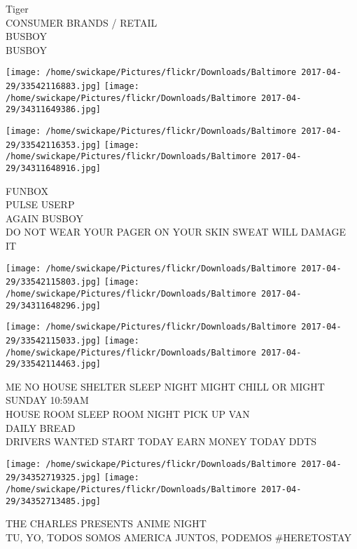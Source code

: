 \documentclass[10pt,letterpaper]{article}
\begin{document}
Tiger\\
CONSUMER BRANDS / RETAIL\\
BUSBOY\\
BUSBOY\\
\pagebreak

\texttt{[image: /home/swickape/Pictures/flickr/Downloads/Baltimore 2017-04-29/33542116883.jpg]}
\texttt{[image: /home/swickape/Pictures/flickr/Downloads/Baltimore 2017-04-29/34311649386.jpg]}

\texttt{[image: /home/swickape/Pictures/flickr/Downloads/Baltimore 2017-04-29/33542116353.jpg]}
\texttt{[image: /home/swickape/Pictures/flickr/Downloads/Baltimore 2017-04-29/34311648916.jpg]}

FUNBOX\\
PULSE USERP\\
AGAIN BUSBOY\\
DO NOT WEAR YOUR PAGER ON YOUR SKIN SWEAT WILL DAMAGE IT\\
\pagebreak

\texttt{[image: /home/swickape/Pictures/flickr/Downloads/Baltimore 2017-04-29/33542115803.jpg]}
\texttt{[image: /home/swickape/Pictures/flickr/Downloads/Baltimore 2017-04-29/34311648296.jpg]}

\texttt{[image: /home/swickape/Pictures/flickr/Downloads/Baltimore 2017-04-29/33542115033.jpg]}
\texttt{[image: /home/swickape/Pictures/flickr/Downloads/Baltimore 2017-04-29/33542114463.jpg]}

ME NO HOUSE SHELTER SLEEP NIGHT MIGHT CHILL OR MIGHT SUNDAY 10:59AM\\
HOUSE ROOM SLEEP ROOM NIGHT PICK UP VAN\\
DAILY BREAD\\
DRIVERS WANTED START TODAY EARN MONEY TODAY DDTS\\
\pagebreak

\texttt{[image: /home/swickape/Pictures/flickr/Downloads/Baltimore 2017-04-29/34352719325.jpg]}
\texttt{[image: /home/swickape/Pictures/flickr/Downloads/Baltimore 2017-04-29/34352713485.jpg]}

THE CHARLES PRESENTS ANIME NIGHT\\
TU, YO, TODOS SOMOS AMERICA JUNTOS, PODEMOS \#HERETOSTAY\\
\pagebreak
\end{document}
